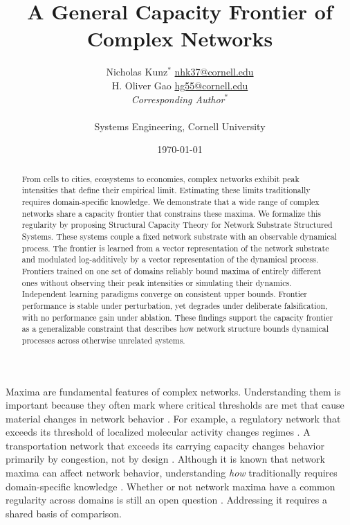 \documentclass{article}
\begin{document}
\linenumbers
\title{A General Capacity Frontier of Complex Networks}
\author{
    Nicholas Kunz$^{\textbf{*}}$ \href{mailto:nhk37@cornell.edu}{nhk37@cornell.edu}\\
    H. Oliver Gao \href{mailto:hg55@cornell.edu}{hg55@cornell.edu}\\
    {\small\textit{Corresponding Author}$^{\textbf{*}}$}\\~\\
    Systems Engineering, Cornell University\\
}
\date{\today}
\maketitle
\thispagestyle{fancy}

\begin{abstract}
\noindent
    From cells to cities, ecosystems to economies, complex networks exhibit peak intensities that define their empirical limit. Estimating these limits traditionally requires domain-specific knowledge. We demonstrate that a wide range of complex networks share a capacity frontier that constrains these maxima. We formalize this regularity by proposing Structural Capacity Theory for Network Substrate Structured Systems. These systems couple a fixed network substrate with an observable dynamical process. The frontier is learned from a vector representation of the network substrate and modulated log-additively by a vector representation of the dynamical process. Frontiers trained on one set of domains reliably bound maxima of entirely different ones without observing their peak intensities or simulating their dynamics. Independent learning paradigms converge on consistent upper bounds. Frontier performance is stable under perturbation, yet degrades under deliberate falsification, with no performance gain under ablation. These findings support the capacity frontier as a generalizable constraint that describes how network structure bounds dynamical processes across otherwise unrelated systems.
\end{abstract}

\vspace{1em}
\label{sec:intro}
Maxima are fundamental features of complex networks. Understanding them is important because they often mark where critical thresholds are met that cause material changes in network behavior \citep{ref01, ref02, ref16, ref33, ref34}. For example, a regulatory network that exceeds its threshold of localized molecular activity changes regimes \citep{ref25,ref02}. A transportation network that exceeds its carrying capacity changes behavior primarily by congestion, not by design \citep{ref03,ref04}. Although it is known that network maxima can affect network behavior, understanding \textit{how} traditionally requires domain-specific knowledge \citep{ref02,ref03}. Whether or not network maxima have a common regularity across domains is still an open question \citep{ref13,ref14,ref15}. Addressing it requires a shared basis of comparison.
\end{document}
